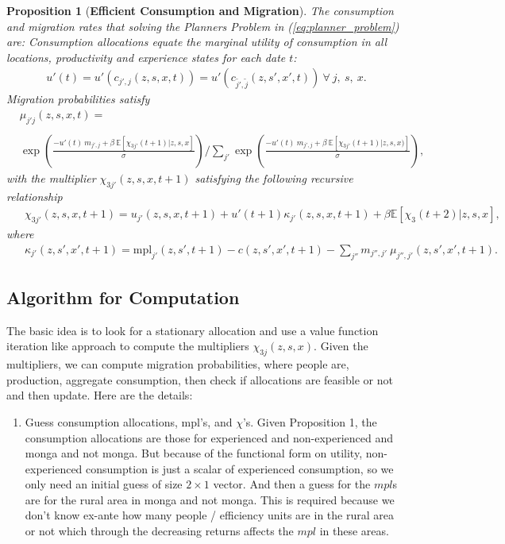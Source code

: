 \documentclass[12pt,pdftex]{article}
\newtheorem{proposition}{Proposition}
\begin{document}
\begin{onehalfspacing}
\begin{proposition}[\textbf{Efficient Consumption and Migration}] \label{apx-prp:efficient} The consumption and migration rates that solving the Planners Problem in (\ref{eq:planner_problem}) are: Consumption allocations equate the marginal utility of consumption in all locations, productivity and experience states for each date $t$:
{\small
\begin{align}
u'(t) = u'(c_{j',j}(z, s, x, t)) = u'(c_{\tilde{j'},\tilde{j}}(z, s', x', t)) \ \forall \ j, \ s, \ x.
\label{eq:foc_planner2}
\end{align}
}
Migration probabilities satisfy
{\footnotesize
\begin{align}
& \mu_{j'j}(z,s,x,t)  = \nonumber \\
\nonumber \\
& \exp \left(\frac{- u'(t) \ m_{j',j} + \beta \ \mathbb{E}\left[\chi_{3j'}(t+1)| z,s,x\right]}{\sigma} \right)  \Bigg / \sum_{j'} \exp \left( \frac{- u'(t)\ m_{j',j} + \beta \  \mathbb{E}\left[\chi_{3j'}(t+1)|z,s,x ) \right]}{\sigma} \right), \label{eq:migration_prob}
\end{align}
}
with the multiplier $\chi_{3j'}(z, s, x, t+1)$ satisfying the following recursive relationship
{\small
\begin{align}
& \ \ \chi_{3j'}(z, s, x, t+1) =  u_{j'}(z, s, x, t+1) +  u'(t+1) \kappa_{j'}(z, s,x,t+1) + \beta \mathbb{E}\left[\chi_{3}(t+2)|z, s, x  \right], \label{eq:dynamic_multiplier}
\end{align}}
where
{\small
\begin{align}
& \ \ \kappa_{j'}(z, s',x',t+1) = \mbox{mpl}_{j'}(z,s',t+1) - c(z, s',x',t+1) - \sum_{j''}  m_{j'',j'} \ \mu_{j'',j'}(z, s', x', t+1). \label{eq:kappa}
\end{align}}
\end{proposition}


\subsection{Algorithm for Computation}

The basic idea is to look for a stationary allocation and use a value function iteration like approach to compute the multipliers $\chi_{3j}(z, s, x)$. Given the multipliers, we can compute migration probabilities, where people are, production, aggregate consumption, then check if allocations are feasible or not and then update. Here are the details:
\begin{enumerate}
\item Guess consumption allocations, mpl's, and $\chi$'s. Given Proposition 1, the consumption allocations are those for experienced and non-experienced and monga and not monga. But because of the functional form on utility, non-experienced consumption is just a scalar of experienced consumption, so we only need an initial guess of size $2\times1$ vector. And then a guess for the $mpl$s are for the rural area in monga and not monga. This is required because we don't know ex-ante how many people / efficiency units are in the rural area or not which through the decreasing returns affects the $mpl$ in these areas.


\end{enumerate}
\end{onehalfspacing}
\end{document}
